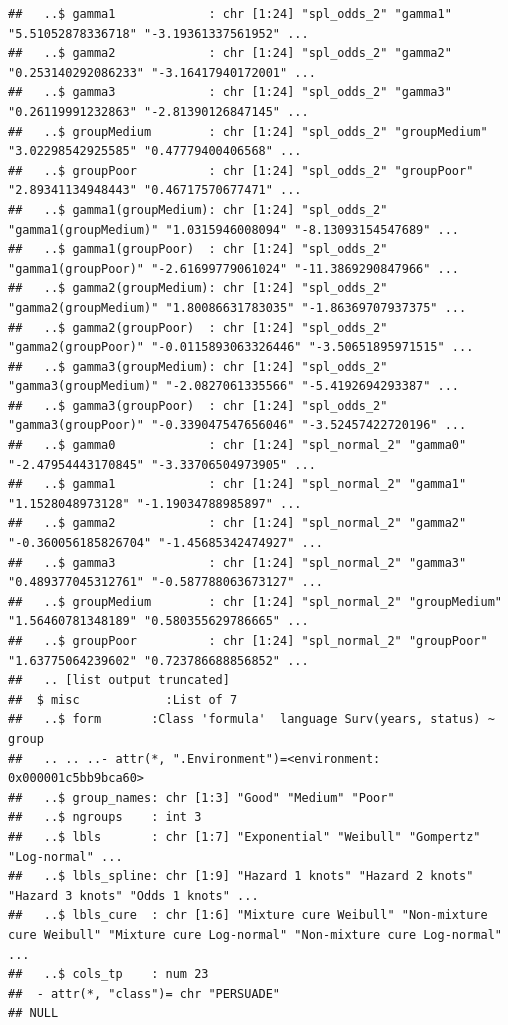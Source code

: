 \documentclass[
]{article}
\begin{document}
\begin{verbatim}
##   ..$ gamma1             : chr [1:24] "spl_odds_2" "gamma1" "5.51052878336718" "-3.19361337561952" ...
##   ..$ gamma2             : chr [1:24] "spl_odds_2" "gamma2" "0.253140292086233" "-3.16417940172001" ...
##   ..$ gamma3             : chr [1:24] "spl_odds_2" "gamma3" "0.26119991232863" "-2.81390126847145" ...
##   ..$ groupMedium        : chr [1:24] "spl_odds_2" "groupMedium" "3.02298542925585" "0.47779400406568" ...
##   ..$ groupPoor          : chr [1:24] "spl_odds_2" "groupPoor" "2.89341134948443" "0.46717570677471" ...
##   ..$ gamma1(groupMedium): chr [1:24] "spl_odds_2" "gamma1(groupMedium)" "1.0315946008094" "-8.13093154547689" ...
##   ..$ gamma1(groupPoor)  : chr [1:24] "spl_odds_2" "gamma1(groupPoor)" "-2.61699779061024" "-11.3869290847966" ...
##   ..$ gamma2(groupMedium): chr [1:24] "spl_odds_2" "gamma2(groupMedium)" "1.80086631783035" "-1.86369707937375" ...
##   ..$ gamma2(groupPoor)  : chr [1:24] "spl_odds_2" "gamma2(groupPoor)" "-0.0115893063326446" "-3.50651895971515" ...
##   ..$ gamma3(groupMedium): chr [1:24] "spl_odds_2" "gamma3(groupMedium)" "-2.0827061335566" "-5.4192694293387" ...
##   ..$ gamma3(groupPoor)  : chr [1:24] "spl_odds_2" "gamma3(groupPoor)" "-0.339047547656046" "-3.52457422720196" ...
##   ..$ gamma0             : chr [1:24] "spl_normal_2" "gamma0" "-2.47954443170845" "-3.33706504973905" ...
##   ..$ gamma1             : chr [1:24] "spl_normal_2" "gamma1" "1.1528048973128" "-1.19034788985897" ...
##   ..$ gamma2             : chr [1:24] "spl_normal_2" "gamma2" "-0.360056185826704" "-1.45685342474927" ...
##   ..$ gamma3             : chr [1:24] "spl_normal_2" "gamma3" "0.489377045312761" "-0.587788063673127" ...
##   ..$ groupMedium        : chr [1:24] "spl_normal_2" "groupMedium" "1.56460781348189" "0.580355629786665" ...
##   ..$ groupPoor          : chr [1:24] "spl_normal_2" "groupPoor" "1.63775064239602" "0.723786688856852" ...
##   .. [list output truncated]
##  $ misc            :List of 7
##   ..$ form       :Class 'formula'  language Surv(years, status) ~ group
##   .. .. ..- attr(*, ".Environment")=<environment: 0x000001c5bb9bca60> 
##   ..$ group_names: chr [1:3] "Good" "Medium" "Poor"
##   ..$ ngroups    : int 3
##   ..$ lbls       : chr [1:7] "Exponential" "Weibull" "Gompertz" "Log-normal" ...
##   ..$ lbls_spline: chr [1:9] "Hazard 1 knots" "Hazard 2 knots" "Hazard 3 knots" "Odds 1 knots" ...
##   ..$ lbls_cure  : chr [1:6] "Mixture cure Weibull" "Non-mixture cure Weibull" "Mixture cure Log-normal" "Non-mixture cure Log-normal" ...
##   ..$ cols_tp    : num 23
##  - attr(*, "class")= chr "PERSUADE"
## NULL
\end{verbatim}
\end{document}
